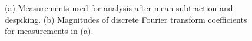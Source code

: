 \documentclass[draft,linenumbers]{agujournal2018}
\begin{document}

\begin{figure}
     \centering
    \hfill
     \caption{(a) Measurements used for analysis after mean subtraction and despiking. (b) Magnitudes of discrete Fourier transform coefficients for measurements in (a).}
  \label{fig:timeseries}
\end{figure}
\end{document}

